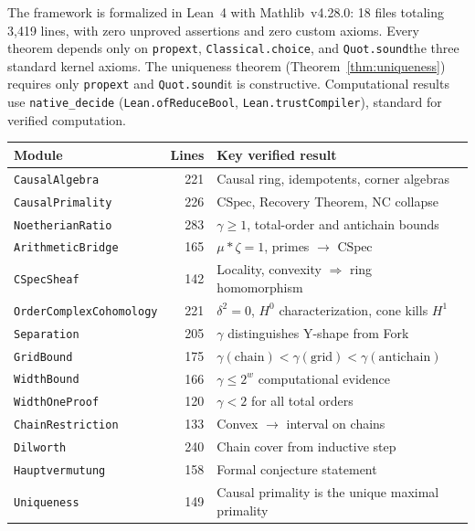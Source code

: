 \documentclass[11pt,a4paper]{article}
\theoremstyle{plain}
\theoremstyle{definition}
\theoremstyle{remark}
\newcommand{\CSpec}{\mathrm{CSpec}}
\begin{document}
The framework is formalized in Lean~4 with Mathlib~v4.28.0: 18 files totaling 3{,}419 lines, with zero unproved assertions and zero custom axioms.
Every theorem depends only on \texttt{propext}, \texttt{Classical.choice}, and \texttt{Quot.sound}\textemdash the three standard kernel axioms.
The uniqueness theorem (Theorem~\ref{thm:uniqueness}) requires only \texttt{propext} and \texttt{Quot.sound}\textemdash it is constructive.
Computational results use \texttt{native\_decide} (\texttt{Lean.ofReduceBool}, \texttt{Lean.trustCompiler}), standard for verified computation.

\medskip
\begin{center}
\begin{tabular}{lrl}
\toprule
\textbf{Module} & \textbf{Lines} & \textbf{Key verified result} \\
\midrule
\texttt{CausalAlgebra}          & 221 & Causal ring, idempotents, corner algebras \\
\texttt{CausalPrimality}        & 226 & $\CSpec$, Recovery Theorem, NC collapse \\
\texttt{NoetherianRatio}        & 283 & $\gamma \geq 1$, total-order and antichain bounds \\
\texttt{ArithmeticBridge}       & 165 & $\mu * \zeta = 1$, primes $\to$ $\CSpec$ \\
\texttt{CSpecSheaf}             & 142 & Locality, convexity $\Rightarrow$ ring homomorphism \\
\texttt{OrderComplexCohomology} & 221 & $\delta^2 = 0$, $H^0$ characterization, cone kills $H^1$ \\
\texttt{Separation}             & 205 & $\gamma$ distinguishes Y-shape from Fork \\
\texttt{GridBound}              & 175 & $\gamma(\text{chain}) < \gamma(\text{grid}) < \gamma(\text{antichain})$ \\
\texttt{WidthBound}             & 166 & $\gamma \leq 2^w$ computational evidence \\
\texttt{WidthOneProof}          & 120 & $\gamma < 2$ for all total orders \\
\texttt{ChainRestriction}       & 133 & Convex $\to$ interval on chains \\
\texttt{Dilworth}               & 240 & Chain cover from inductive step \\
\texttt{Hauptvermutung}         & 158 & Formal conjecture statement \\
\texttt{Uniqueness}             & 149 & Causal primality is the unique maximal primality \\

\end{tabular}
\end{center}
\end{document}
